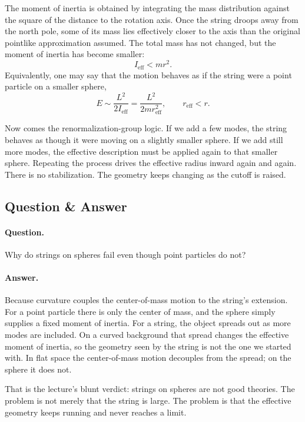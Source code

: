 The moment of inertia is obtained by integrating the mass distribution against the square of the distance to the rotation axis. Once the string droops away from the north pole, some of its mass lies effectively closer to the axis than the original pointlike approximation assumed. The total mass has not changed, but the moment of inertia has become smaller:
\begin{equation}
I_{\mathrm{eff}}<mr^2.
\end{equation}
Equivalently, one may say that the motion behaves as if the string were a point particle on a smaller sphere,
\begin{equation}
E\sim \frac{L^2}{2I_{\mathrm{eff}}}
=
\frac{L^2}{2m r_{\mathrm{eff}}^2},
\qquad
r_{\mathrm{eff}}<r.
\end{equation}

Now comes the renormalization-group logic. If we add a few modes, the string behaves as though it were moving on a slightly smaller sphere. If we add still more modes, the effective description must be applied again to that smaller sphere. Repeating the process drives the effective radius inward again and again. There is no stabilization. The geometry keeps changing as the cutoff is raised.

\subsection{Question \& Answer}

\paragraph{Question.} Why do strings on spheres fail even though point particles do not?

\paragraph{Answer.} Because curvature couples the center-of-mass motion to the string's extension. For a point particle there is only the center of mass, and the sphere simply supplies a fixed moment of inertia. For a string, the object spreads out as more modes are included. On a curved background that spread changes the effective moment of inertia, so the geometry seen by the string is not the one we started with. In flat space the center-of-mass motion decouples from the spread; on the sphere it does not.

That is the lecture's blunt verdict: strings on spheres are not good theories. The problem is not merely that the string is large. The problem is that the effective geometry keeps running and never reaches a limit.

